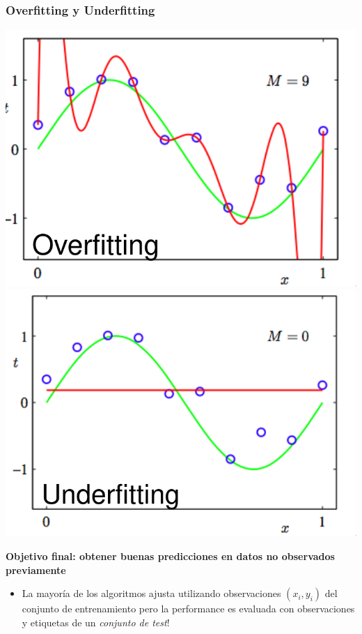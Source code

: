\documentclass[leqno, 10pt, envcountsect]{beamer}
\numberwithin{equation}{section}
\theoremstyle{definition}
\theoremstyle{example}
\numberwithin{figure}{section}
\numberwithin{table}{section}
\let\olditem\item
\renewcommand{\item}{%
\olditem\vspace{1pt}}
\begin{document}
\begin{frame}[fragile=singleslide]
  \frametitle{Overfitting y Underfitting}
  \begin{center}
    \includegraphics[scale=0.12]{overfitting.png}
    \includegraphics[scale=0.12]{underfitting.png}
  \end{center}
    \textbf{Objetivo final: obtener buenas predicciones en datos no observados previamente}
      \begin{itemize}
        \item La mayoría de los algoritmos ajusta utilizando observaciones
          $(x_{i}, y_{i})$ del conjunto de entrenamiento pero la performance es
          evaluada con observaciones y etiquetas de un \textit{conjunto de test}!
      \begin{itemize}

\end{itemize}
\end{itemize}
\end{frame}
\end{document}
